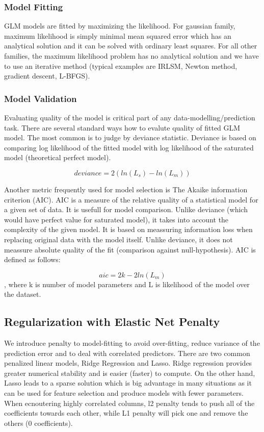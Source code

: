 \documentclass[11pt]{article}
\begin{document}
\subsubsection{Model Fitting}
GLM models are fitted by maximizing the likelihood. For gaussian family, maximum likelihood is simply minimal mean squared error which has an analytical solution and it can be solved with ordinary least squares. For all other families, the maximum likelihood problem has no analytical solution and we have to use an iterative method (typical examples are IRLSM, Newton method, gradient descent, L-BFGS). 
\subsubsection{Model Validation}
Evaluating quality of the model is critical part of any data-modelling/prediction task. There are several standard ways how to evalute quality of fitted GLM model. The most common is to judge by deviance statistic. Deviance is based on comparing log likelihood of the fitted model with log likelihood of the saturated model (theoretical perfect model).

\[ deviance = 2({ln(L_{s})} - {ln(L_{m})}) \]

Another metric frequently used for model selection is The Akaike information criterion (AIC). AIC is a measure of the relative quality of a statistical model for a given set of data. It is usefull for model comparison. Unlike deviance (which would have perfect value for saturated model), it takes into account the complexity of the given model. It is based on meassuring information loss when replacing original data with the model itself. Unlike deviance, it does not meassure absolute quality of the fit (comparison against null-hypothesis). AIC is defined as follows:

\[ aic = 2k - 2ln(L_{m})\]
, where k is number of model parameters and L is likelihood of the model over the dataset.

\subsection{Regularization with Elastic Net Penalty} 
We introduce penalty to model-fitting to avoid over-fitting, reduce variance of the prediction error and to deal with correlated predictors. There are two common penalized linear models, Ridge Regression and Lasso. Ridge regression provides greater numerical stability and is easier (faster) to compute. On the other hand, Lasso leads to a sparse solution which is big advantage in many situations as it can be used for feature selection and produce models with fewer parameters. When ecnoutering highly correlated columns, l2 penalty tends to push all of the coefficients towards each other, while L1 penalty will pick one and remove the others (0 coefficients).
\end{document}
